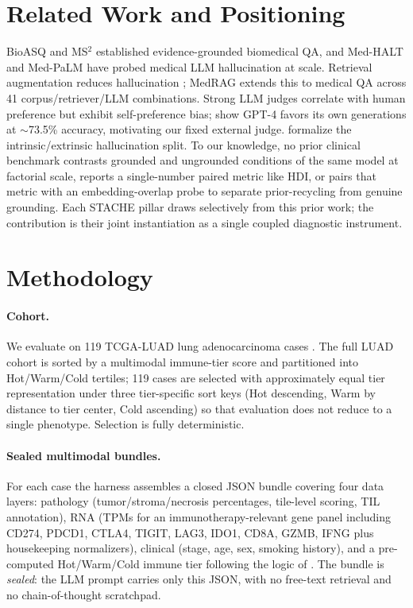 \documentclass{article}
\theoremstyle{plain}
\begin{document}
\section{Related Work and Positioning}
\label{sec:related}

BioASQ \citep{tsatsaronis2015bioasq} and MS$^2$ \citep{deyoung2021ms2} established evidence-grounded biomedical QA, and Med-HALT \citep{pal2023medhalt} and Med-PaLM \citep{singhal2023largelanguagemodelsencode} have probed medical LLM hallucination at scale. Retrieval augmentation reduces hallucination \citep{lewis2020rag,shuster2021retrieval}; MedRAG \citep{xiong2024benchmarking} extends this to medical QA across 41 corpus/retriever/LLM combinations. Strong LLM judges \citep{zheng2023judging} correlate with human preference but exhibit self-preference bias; \citet{panickssery2024llm} show GPT-4 favors its own generations at $\sim$73.5\% accuracy, motivating our fixed external judge. \citet{ji2023survey,maynez2020faithfulness} formalize the intrinsic/extrinsic hallucination split. To our knowledge, no prior clinical benchmark contrasts grounded and ungrounded conditions of the same model at factorial scale, reports a single-number paired metric like HDI, or pairs that metric with an embedding-overlap probe to separate prior-recycling from genuine grounding. Each STACHE pillar draws selectively from this prior work; the contribution is their joint instantiation as a single coupled diagnostic instrument.

\section{Methodology}
\label{sec:methods}

\paragraph{Cohort.} We evaluate on 119 TCGA-LUAD lung adenocarcinoma cases \citep{collisson2014comprehensive}. The full LUAD cohort is sorted by a multimodal immune-tier score and partitioned into Hot/Warm/Cold tertiles; 119 cases are selected with approximately equal tier representation under three tier-specific sort keys (Hot descending, Warm by distance to tier center, Cold ascending) so that evaluation does not reduce to a single phenotype. Selection is fully deterministic.

\paragraph{Sealed multimodal bundles.} For each case the harness assembles a closed JSON bundle covering four data layers: pathology (tumor/stroma/necrosis percentages, tile-level scoring, TIL annotation), RNA (TPMs for an immunotherapy-relevant gene panel including CD274, PDCD1, CTLA4, TIGIT, LAG3, IDO1, CD8A, GZMB, IFNG plus housekeeping normalizers), clinical (stage, age, sex, smoking history), and a pre-computed Hot/Warm/Cold immune tier following the logic of \citet{thorsson2018immune}. The bundle is \emph{sealed}: the LLM prompt carries only this JSON, with no free-text retrieval and no chain-of-thought scratchpad.
\end{document}
